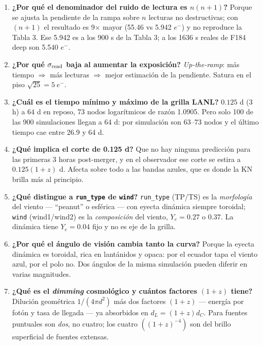 \documentclass[11pt,a4paper]{article}
\newcommand{\code}[1]{\texttt{\small #1}}
\newcommand{\eminus}{e^{-}}
\begin{document}
\begin{enumerate}[itemsep=3pt]
\item \textbf{¿Por qué el denominador del ruido de lectura es $n(n+1)$?}
      Porque se ajusta la pendiente de la rampa sobre $n$ lecturas no destructivas; con $(n+1)$ el
      resultado es 9$\times$ mayor (55.46 vs 5.942 $\eminus$) y no reproduce la Tabla 3. Ese 5.942
      es a los 900 s de la Tabla 3; a los 1636 s reales de F184 deep son 5.540 $\eminus$.

\item \textbf{¿Por qué $\sigma_{\rm read}$ baja al aumentar la exposición?}
      \emph{Up-the-ramp}: más tiempo $\Rightarrow$ más lecturas $\Rightarrow$ mejor estimación de la
      pendiente. Satura en el piso $\sqrt{25}=5\ \eminus$.

\item \textbf{¿Cuál es el tiempo mínimo y máximo de la grilla LANL?}
      $0.125$ d (3 h) a $64$ d en reposo, 73 nodos logarítmicos de razón 1.0905. Pero solo 100 de
      las 900 simulaciones llegan a 64 d: por simulación son 63--73 nodos y el último tiempo cae
      entre 26.9 y 64 d.

\item \textbf{¿Qué implica el corte de 0.125 d?}
      Que no hay ninguna predicción para las primeras 3 horas post-merger, y en el observador ese
      corte se estira a $0.125(1+z)$ d. Afecta sobre todo a las bandas azules, que es donde la KN
      brilla más al principio.

\item \textbf{¿Qué distingue a \code{run\_type} de \code{wind}?}
      \code{run\_type} (TP/TS) es la \emph{morfología} del viento --- ``peanut'' o esférica --- con
      eyecta dinámica siempre toroidal; \code{wind} (wind1/wind2) es la \emph{composición} del
      viento, $Y_e = 0.27$ o $0.37$. La dinámica tiene $Y_e = 0.04$ fijo y no es eje de la grilla.

\item \textbf{¿Por qué el ángulo de visión cambia tanto la curva?}
      Porque la eyecta dinámica es toroidal, rica en lantánidos y opaca: por el ecuador tapa el
      viento azul, por el polo no. Dos ángulos de la misma simulación pueden diferir en varias
      magnitudes.

\item \textbf{¿Qué es el \emph{dimming} cosmológico y cuántos factores $(1+z)$ tiene?}
      Dilución geométrica $1/(4\pi d^2)$ más dos factores $(1+z)$ --- energía por fotón y tasa de
      llegada --- ya absorbidos en $d_L = (1+z)d_C$. Para fuentes puntuales son \emph{dos}, no
      cuatro; los cuatro $((1+z)^{-4})$ son del brillo superficial de fuentes extensas.


\end{enumerate}
\end{document}
